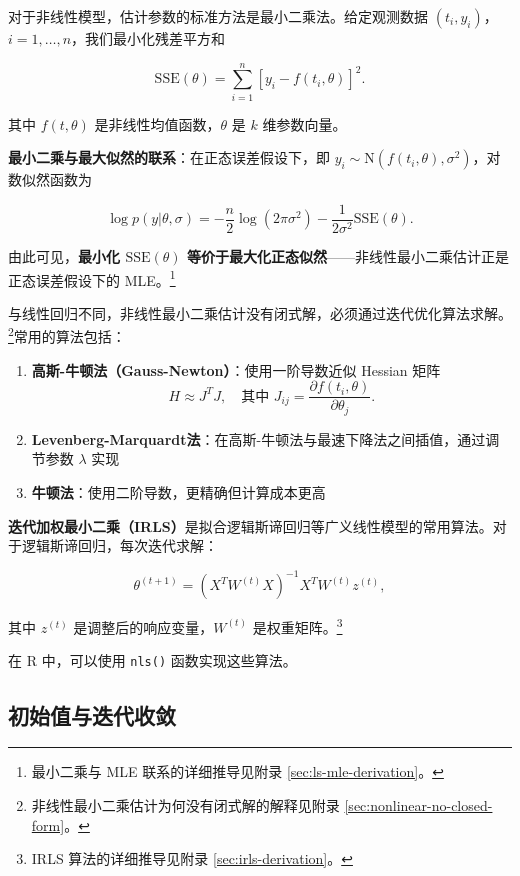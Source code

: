 对于非线性模型，估计参数的标准方法是最小二乘法。给定观测数据 $(t_i, y_i)$，$i = 1, \ldots, n$，我们最小化残差平方和

\begin{equation}
\mathrm{SSE}(\theta) = \sum_{i=1}^{n} [y_i - f(t_i, \theta)]^2. \label{eq:nonlinear-sse}
\end{equation}

其中 $f(t, \theta)$ 是非线性均值函数，$\theta$ 是 $k$ 维参数向量。

\textbf{最小二乘与最大似然的联系}：在正态误差假设下，即 $y_i \sim \mathrm{N}(f(t_i, \theta), \sigma^2)$，对数似然函数为

\[
\log p(y | \theta, \sigma) = -\frac{n}{2}\log(2\pi\sigma^2) - \frac{1}{2\sigma^2}\mathrm{SSE}(\theta).
\]

由此可见，\textbf{最小化 $\mathrm{SSE}(\theta)$ 等价于最大化正态似然}——非线性最小二乘估计正是正态误差假设下的 MLE。\footnote{最小二乘与 MLE 联系的详细推导见附录 \cref{sec:ls-mle-derivation}。}

与线性回归不同，非线性最小二乘估计没有闭式解，必须通过迭代优化算法求解。\footnote{非线性最小二乘估计为何没有闭式解的解释见附录 \cref{sec:nonlinear-no-closed-form}。}常用的算法包括：

\begin{enumerate}
  \item \textbf{高斯-牛顿法（Gauss-Newton）}：使用一阶导数近似 Hessian 矩阵
    \[
    H \approx J^T J, \quad \text{其中 } J_{ij} = \frac{\partial f(t_i, \theta)}{\partial \theta_j}. \label{eq:gauss-newton}
    \]
  \item \textbf{Levenberg-Marquardt法}：在高斯-牛顿法与最速下降法之间插值，通过调节参数 $\lambda$ 实现
  \item \textbf{牛顿法}：使用二阶导数，更精确但计算成本更高
\end{enumerate}

\textbf{迭代加权最小二乘（IRLS）}是拟合逻辑斯谛回归等广义线性模型的常用算法。对于逻辑斯谛回归，每次迭代求解：

\begin{equation}
\theta^{(t+1)} = (X^T W^{(t)} X)^{-1} X^T W^{(t)} z^{(t)}, \label{eq:irls-logistic}
\end{equation}

其中 $z^{(t)}$ 是调整后的响应变量，$W^{(t)}$ 是权重矩阵。\footnote{IRLS 算法的详细推导见附录 \cref{sec:irls-derivation}。}

在 R 中，可以使用 \texttt{nls()} 函数实现这些算法。

\subsection{初始值与迭代收敛}

